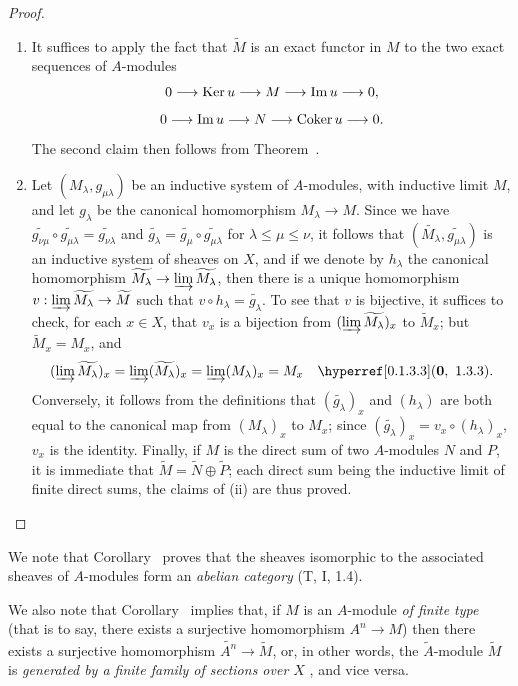 \begin{proof}
\medskip\noindent
\begin{enumerate}
  \item[(i)] It suffices to apply the fact that $\widetilde{M}$ is an exact functor in $M$  to the two exact sequences of $A$-modules
    \[
      0\to\Ker u\to M\to\Im u\to 0,
    \]
    \[
      0\to\Im u\to N\to\Coker u\to 0.
    \]
    The second claim then follows from Theorem~.
  \item[(ii)] Let $(M_\lambda,g_{\mu\lambda})$ be an inductive system of $A$-modules, with inductive limit $M$, and let $g_\lambda$ be the canonical homomorphism $M_\lambda\to M$.
    Since we have $\widetilde{g_{\nu\mu}}\circ\widetilde{g_{\mu\lambda}}=\widetilde{g_{\nu\lambda}}$ and $\widetilde{g_\lambda}=\widetilde{g_\mu}\circ\widetilde{g_{\mu\lambda}}$ for $\lambda\leq\mu\leq\nu$, it follows that $(\widetilde{M_\lambda},\widetilde{g_{\mu\lambda}})$ is an inductive system of sheaves on $X$, and if we denote by $h_\lambda$ the canonical homomorphism $\widetilde{M_\lambda}\to\varinjlim\widetilde{M_\lambda}$, then there is a unique homomorphism $v:\varinjlim\widetilde{M_\lambda}\to\widetilde{M}$ such that $v\circ h_\lambda=\widetilde{g_\lambda}$.
    To see that $v$ is bijective, it suffices to check, for each $x\in X$, that $v_x$ is a bijection from $(\varinjlim\widetilde{M_\lambda})_x$ to $\widetilde{M}_x$;
    but $\widetilde{M}_x=M_x$, and
    \[
      (\varinjlim\widetilde{M_\lambda})_x=\varinjlim(\widetilde{M_\lambda})_x
      =\varinjlim(M_\lambda)_x=M_x\quad\sref[0]{0.1.3.3}.
    \]
    Conversely, it follows from the definitions that $(\widetilde{g_\lambda})_x$ and
    $(h_\lambda)$ are both equal to the canonical map from $(M_\lambda)_x$ to $M_x$;
    since $(\widetilde{g_\lambda})_x=v_x\circ(h_\lambda)_x$, $v_x$ is the identity.
    Finally, if $M$ is the direct sum of two $A$-modules $N$ and $P$, it is immediate that $\widetilde{M}=\widetilde{N}\oplus\widetilde{P}$;
    each direct sum being the inductive limit of finite direct sums, the claims of (ii) are thus proved.
\end{enumerate}
\end{proof}

We note that Corollary~ proves that the sheaves isomorphic to the associated sheaves of $A$-modules form an \emph{abelian category} (T, I, 1.4).

We also note that Corollary~ implies that, if $M$ is an $A$-module \emph{of finite type} (that is to say, there exists a surjective homomorphism $A^n\to M$) then there exists a surjective homomorphism $\widetilde{A^n}\to\widetilde{M}$, or, in other words, the $\widetilde{A}$-module $\widetilde{M}$ is \emph{generated by a finite family of sections over $X$} , and vice versa.

